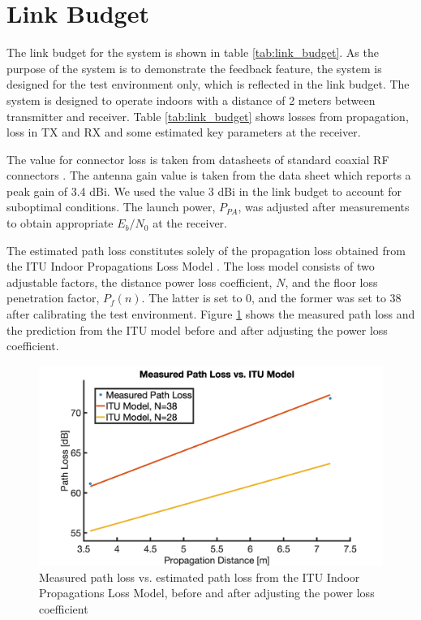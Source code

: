 \section{Link Budget}
\label{sec:link_budget}
The link budget for the system is shown in table \ref{tab:link_budget}. As the purpose of the system is to demonstrate the feedback feature, the system is designed for the test environment only, which is reflected in the link budget. The system is designed to operate indoors with a distance of 2 meters between transmitter and receiver. Table \ref{tab:link_budget} shows losses from propagation, loss in TX and RX and some estimated key parameters at the receiver. 



The value for connector loss is taken from datasheets of standard coaxial RF connectors \cite{rfconnector}. The antenna gain value is taken from the data sheet \cite{antenna} which reports a peak gain of 3.4 dBi. We used the value 3 dBi in the link budget to account for suboptimal conditions. The launch power, $P_{PA}$, was adjusted after measurements to obtain appropriate $E_b/N_0$ at the receiver.

The estimated path loss constitutes solely of the propagation loss obtained from the ITU Indoor Propagations Loss Model \cite{itu_model}. The loss model consists of two adjustable factors, the distance power loss coefficient, $N$, and the floor loss penetration factor, $P_f(n)$. The latter is set to 0, and the former was set to 38 after calibrating the test environment. Figure \ref{fig:path_loss} shows the measured path loss and the prediction from the ITU model before and after adjusting the power loss coefficient.

\begin{figure}[htbp]
\begin{center}
\includegraphics[width=\figW\linewidth]{PathLoss.png}
\caption{Measured path loss vs. estimated path loss from the ITU Indoor Propagations Loss Model, before and after adjusting the power loss coefficient}
\label{fig:path_loss}
\end{center}
\end{figure}


